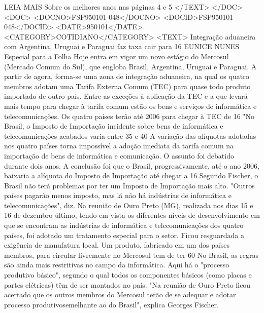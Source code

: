 LEIA MAIS   
Sobre os melhores anos nas páginas 4 e 5
</TEXT>
</DOC>
<DOC>
<DOCNO>FSP950101-048</DOCNO>
<DOCID>FSP950101-048</DOCID>
<DATE>950101</DATE>
<CATEGORY>COTIDIANO</CATEGORY>
<TEXT>
Integração aduaneira com Argentina, Uruguai e Paraguai faz taxa cair para 16%
EUNICE NUNES 
Especial para a Folha 
Hoje entra em vigor um novo estágio do Mercosul (Mercado Comum do Sul), que engloba Brasil, Argentina, Uruguai e Paraguai. A partir de agora, forma-se uma zona de integração aduaneira, na qual os quatro membros adotam uma Tarifa Externa Comum (TEC) para quase todo produto importado de outro país.
Entre as exceções à aplicação da TEC e a que levará mais tempo para chegar à tarifa comum estão os bens e serviços de informática e telecomunicações. Os quatro países terão até 2006 para chegar à TEC de 16%
"No Brasil, o Imposto de Importação incidente sobre bens de informática e telecomunicações acabados varia entre 35 e 40%
A variação das alíquotas adotadas nos quatro países torna impossível a adoção imediata da tarifa comum na importação de bens de informática e comunicação.
O assunto foi debatido durante dois anos. A conclusão foi que o Brasil, progressivamente, até o ano 2006, baixaria a alíquota do Imposto de Importação até chegar a 16%
Segundo Fischer, o Brasil não terá problemas por ter um Imposto de Importação mais alto. "Outros países pagarão menos imposto, mas lá não há indústrias de informática e telecomunicações", diz.
Na reunião de Ouro Preto (MG), realizada nos dias 15 e 16 de dezembro último, tendo em vista os diferentes níveis de desenvolvimento em que se encontram as indústrias de informática e telecomunicações dos quatro países, foi adotado um tratamento especial para o setor. Ficou resguardada a exigência de manufatura local.
Um produto, fabricado em um dos países membros, para circular livremente no Mercosul tem de ter 60%
No Brasil, as regras são ainda mais restritivas no campo da informática. Aqui há o "processo produtivo básico", segundo o qual todos os componentes básicos (como placas e partes elétricas) têm de ser montados no país.
"Na reunião de Ouro Preto ficou acertado que os outros membros do Mercosul terão de se adequar e adotar processo produtivosemelhante ao do Brasil", explica Georges Fischer.
